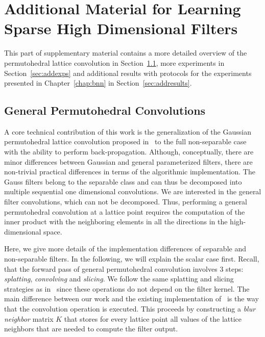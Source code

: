 \clearpage

\section{Additional Material for Learning Sparse High Dimensional Filters}
\label{sec:appendix-bnn}

This part of supplementary material contains a more detailed overview of the permutohedral
lattice convolution in Section~\ref{sec:permconv}, more experiments in
Section~\ref{sec:addexps} and additional results with protocols for
the experiments presented in Chapter~\ref{chap:bnn} in Section~\ref{sec:addresults}.

\vspace{-0.2cm}
\subsection{General Permutohedral Convolutions}
\label{sec:permconv}

A core technical contribution of this work is the generalization of the Gaussian permutohedral lattice
convolution proposed in~\cite{adams2010fast} to the full non-separable case with the
ability to perform back-propagation. Although, conceptually, there are minor
differences between Gaussian and general parameterized filters, there are non-trivial practical
differences in terms of the algorithmic implementation. The Gauss filters belong to
the separable class and can thus be decomposed into multiple
sequential one dimensional convolutions. We are interested in the general filter
convolutions, which can not be decomposed. Thus, performing a general permutohedral
convolution at a lattice point requires the computation of the inner product with the
neighboring elements in all the directions in the high-dimensional space.

Here, we give more details of the implementation differences of separable
and non-separable filters. In the following, we will explain the scalar case first.
Recall, that the forward pass of general permutohedral convolution
involves 3 steps: \textit{splatting}, \textit{convolving} and \textit{slicing}.
We follow the same splatting and slicing strategies as in~\cite{adams2010fast}
since these operations do not depend on the filter kernel. The main difference
between our work and the existing implementation of~\cite{adams2010fast} is
the way that the convolution operation is executed. This proceeds by constructing
a \emph{blur neighbor} matrix $K$ that stores for every lattice point all
values of the lattice neighbors that are needed to compute the filter output.

